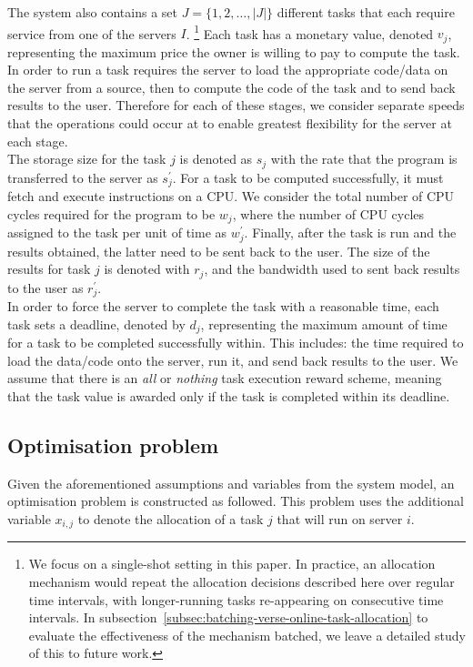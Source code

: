 The system also contains a set $J = \{1,2,\ldots,\left| J \right|\}$ different tasks that each require service from one
of the servers $I$.
\footnote{We focus on a single-shot setting in this paper. In practice, an allocation mechanism would repeat the
allocation decisions described here over regular time intervals, with longer-running tasks re-appearing on consecutive
time intervals. In subsection~\ref{subsec:batching-verse-online-task-allocation} to evaluate the effectiveness 
of the mechanism batched, we leave a detailed study of this to future work.} Each task has a monetary value, denoted $v_j$,
representing the maximum price the owner is willing to pay to compute the task. \\
In order to run a task requires the server to load the appropriate code/data on the server from a source, then to
compute the code of the task and to send back results to the user. Therefore for each of these stages, we consider
separate speeds that the operations could occur at to enable greatest flexibility for the server at each stage. \\
The storage size for the task $j$ is denoted as $s_j$ with the rate that the program is transferred to the server
as $s^{'}_j$. For a task to be computed successfully, it must fetch and execute instructions on a CPU. We consider the
total number of CPU cycles required for the program to be $w_j$, where the number of CPU cycles assigned to the task
per unit of time as $w^{'}_j$. Finally, after the task is run and the results obtained, the latter need to be sent back
to the user. The size of the results for task $j$ is denoted with $r_j$, and the bandwidth used to sent back results to
the user as $r^{'}_j$. \\
In order to force the server to complete the task with a reasonable time, each task sets a deadline, denoted by $d_j$,
representing the maximum amount of time for a task to be completed successfully within. This includes: the time
required to load the data/code onto the server, run it, and send back results to the user. We assume that there
is an \emph{all} or \emph{nothing} task execution reward scheme, meaning that the task value is awarded only if the
task is completed within its deadline.

\subsection{Optimisation problem}
\label{subsec:optimisation-problem}
Given the aforementioned assumptions and variables from the system model, an optimisation problem is constructed as
followed. This problem uses the additional variable $x_{i,j}$ to denote the allocation of a task $j$ that will run on
server $i$.

